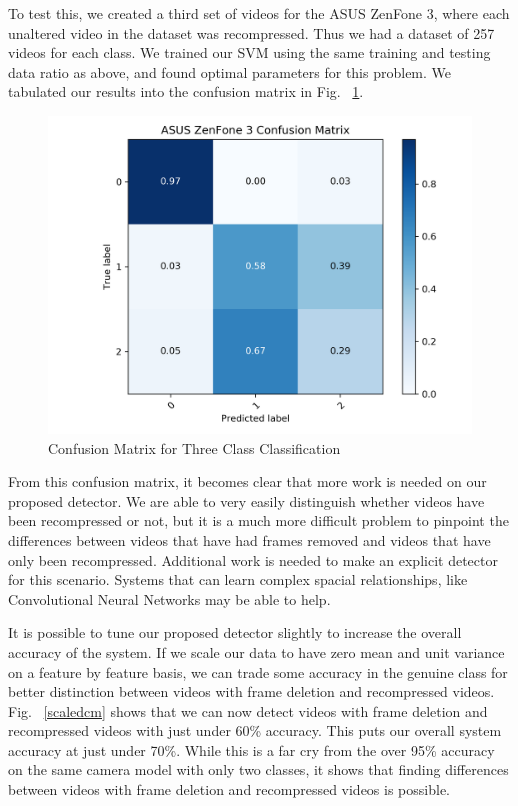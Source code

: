 To test this, we created a third set of videos for the ASUS ZenFone 3, where each unaltered video in the dataset was recompressed. Thus we had a dataset of 257 videos for each class. We trained our SVM using the same training and testing data ratio as above, and found optimal parameters for this problem. We tabulated our results into the confusion matrix in Fig. ~\ref{normalcm}.

\begin{figure}[htbp]
\centerline{\includegraphics[width=0.7\linewidth]{ExperimentalResults/regular_cm.png}}
\caption{Confusion Matrix for Three Class Classification}
\label{normalcm}
\end{figure}

From this confusion matrix, it becomes clear that more work is needed on our proposed detector. We are able to very easily distinguish whether videos have been recompressed or not, but it is a much more difficult problem to pinpoint the differences between videos that have had frames removed and videos that have only been recompressed. Additional work is needed to make an explicit detector for this scenario. Systems that can learn complex spacial relationships, like Convolutional Neural Networks may be able to help. 

It is possible to tune our proposed detector slightly to increase the overall accuracy of the system. If we scale our data to have zero mean and unit variance on a feature by feature basis, we can trade some accuracy in the genuine class for better distinction between videos with frame deletion and recompressed videos. Fig. ~\ref{scaledcm} shows that we can now detect videos with frame deletion and recompressed videos with just under 60\% accuracy. This puts our overall system accuracy at just under 70\%. While this is a far cry from the over 95\% accuracy on the same camera model with only two classes, it shows that finding differences between videos with frame deletion and recompressed videos is possible.

